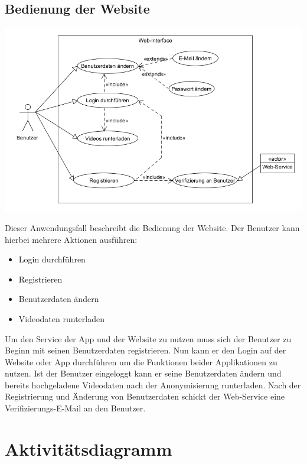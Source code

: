 \subsection{Bedienung der Website}
\begin{center}
\includegraphics[width=1\textwidth]{subtopicsFuncspec/systemModels/WebsiteAWFDiagram.png}
\end{center}	
Dieser Anwendungsfall beschreibt die Bedienung der Website.
Der Benutzer kann hierbei mehrere Aktionen ausführen:
\begin{itemize}
\item Login durchführen
\item Registrieren
\item Benutzerdaten ändern
\item Videodaten runterladen
\end{itemize}
Um den Service der App und der Website zu nutzen muss sich der Benutzer zu Beginn mit seinen Benutzerdaten registrieren. 
Nun kann er den Login auf der Website oder App durchführen um die Funktionen beider Applikationen zu nutzen. 
Ist der Benutzer eingeloggt kann er seine Benutzerdaten ändern und bereits hochgeladene Videodaten nach der Anonymisierung runterladen.
Nach der Registrierung und Änderung von Benutzerdaten schickt der Web-Service eine Verifizierungs-E-Mail an den Benutzer.
\section{Aktivitätsdiagramm}

